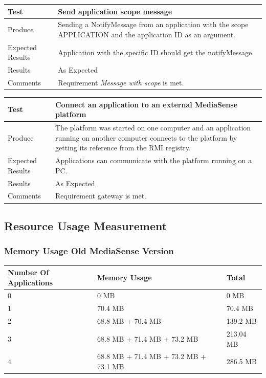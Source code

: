 \begin{center}
    \begin{tabular}{ | l | p{12cm} |}
    \hline
    Test 	 				& 		 Send application scope message\\ \hline
	Produce  				& 		 Sending a NotifyMessage from an application with the scope APPLICATION and the application ID as an argument. \\ \hline
	Expected Results  		& 		 Application with the specific ID should get the notifyMessage. \\ \hline
	Results 				& 		 As Expected\\ \hline
	Comments				& 		 Requirement \emph{Message with scope} is met.\\ \hline
    \end{tabular}
\end{center}

\begin{center}
    \begin{tabular}{ | l | p{12cm} |}
    \hline
    Test 	 				& 		 Connect an application to an external MediaSense platform\\ \hline
	Produce  				& 		 The platform was started on one computer and an application running on another computer connects to the platform by getting its reference from the RMI registry.\\ \hline
	Expected Results  		& 		 Applications can communicate with the platform running on a PC. \\ \hline
	Results 				& 		 As Expected\\ \hline
	Comments				& 		 Requirement gateway is met. \\ \hline
    \end{tabular}
\end{center}

\subsection{Resource Usage Measurement}

\subsubsection{Memory Usage Old MediaSense Version}
\begin{center}
    \begin{tabular}{ | l | p{9cm} | l |}
    \hline
    Number Of Applications 								& Memory Usage 									& Total\\ \hline
    0 													& 0 MB 											& 0 MB\\ \hline
    1 													& 70.4 MB 										& 70.4 MB\\ \hline
    2 													& 68.8 MB + 70.4 MB								& 139.2 MB\\ \hline
    3 													& 68.8 MB + 71.4 MB + 73.2 MB 					& 213.04 MB\\ \hline
    4 													& 68.8 MB + 71.4 MB + 73.2 MB + 73.1 MB		& 286.5 MB\\ \hline
    \end{tabular}
\end{center}

